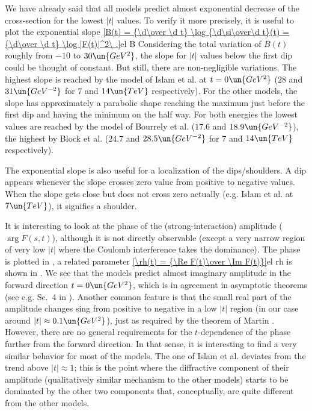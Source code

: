 We have already said that all models predict almost exponential decrease of the cross-section for the lowest $|t|$ values. To verify it more precisely, it is useful to plot the exponential slope
\eqref{B(t) = {\d\over \d t} \log {\d\si\over\d t}(t) = {\d\over \d t} \log |F(t)|^2\ .}{el B}
Considering the total variation of $B(t)$ roughly from $-10$ to $30\un{GeV^2}$, the slope for $|t|$ values below the first dip could be thought of constant. But still, there are non-negligible variations. The highest slope is reached by the model of Islam et al. at $t=0\un{GeV^2}$ ($28$ and $31\un{GeV^{-2}}$ for $7$ and $14\un{TeV}$ respectively). For the other models, the slope has approximately a parabolic shape reaching the maximum just before the first dip and having the minimum on the half way. For both energies the lowest values are reached by the model of Bourrely et al. ($17.6$ and $18.9\un{GeV^{-2}}$), the highest by Block et al. ($24.7$ and $28.5\un{GeV^{-2}}$ for $7$ and $14\un{TeV}$ respectively).

The exponential slope is also useful for a localization of the dips/shoulders. A dip appears whenever the slope crosses zero value from positive to negative values. When the slope gets close but does not cross zero actually (e.g. Islam et al. at $7\un{TeV}$), it signifies a shoulder.


It is interesting to look at the phase of the (strong-interaction) amplitude ($\arg F(s, t)$), although it is not directly observable (except a very narrow region of very low $|t|$ where the Coulomb interference takes the dominance). The phase is plotted in , a related parameter 
\eqref{\rh(t) = {\Re F(t)\over \Im F(t)}}{el rh}
is shown in . We see that the models predict almost imaginary amplitude in the forward direction $t=0\un{GeV^2}$, which is in agreement in asymptotic theorems (see e.g. Sc.~4 in ). Another common feature is that the small real part of the amplitude changes sing from positive to negative in a low $|t|$ region (in our case around $|t| \approx 0.1\un{GeV^2}$), just as required by the theorem of Martin . However, there are no general requirements for the $t$-dependence of the phase further from the forward direction. In that sense, it is interesting to find a very similar behavior for most of the models. The one of Islam et al. deviates from the trend above $|t|\approx 1$; this is the point where the diffractive component of their amplitude (qualitatively similar mechanism to the other models) starts to be dominated by the other two components that, conceptually, are quite different from the other models.


